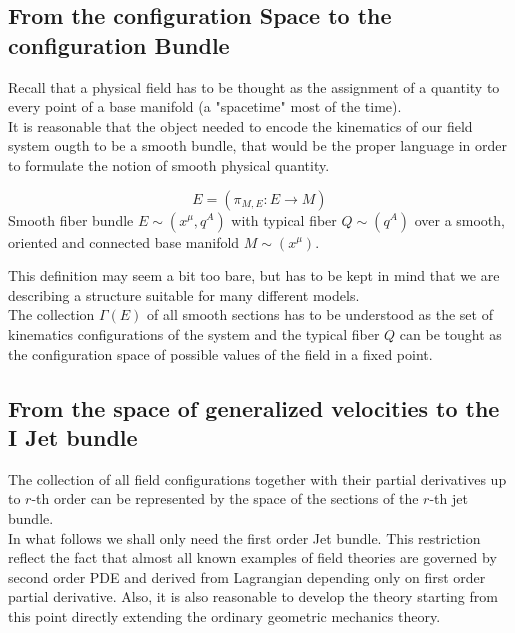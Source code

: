 \subsection{From the configuration Space to the configuration Bundle}
Recall that a physical field has to be thought as the assignment of a quantity to every point of a base manifold (a "spacetime" most of the time).
\\
It is reasonable that the object needed to encode the kinematics of our field system ougth to be a smooth bundle, that would be the proper language in order to formulate the notion of smooth physical quantity.
\\
\begin{definition} 
 	\begin{displaymath}
 		E = \left( \pi_{M,E} : E\rightarrow M \right)
 	\end{displaymath}
Smooth fiber bundle $E\sim(x^\mu,q^A)$ with typical fiber $Q\sim(q^A)$ over a smooth, oriented and connected base manifold $M\sim(x^\mu)$.
\end{definition}
This definition may seem a bit too bare, but has to be kept in mind that we are describing a structure suitable for many different models.
\\
The collection $\Gamma(E)$ of all smooth sections has to be understood as the set of kinematics configurations of the system and the typical fiber $Q$ can be tought as the configuration space of possible values of the field in a fixed point.

\subsection{From the space of generalized velocities to the I Jet bundle}
The collection of all field configurations together with their partial derivatives up to $r$-th order can be represented by the space of the sections of the $r$-th jet bundle.
\\
In what follows we shall only need the first order Jet bundle. This restriction reflect the fact that almost all known examples of field theories are governed by second order PDE and derived from Lagrangian depending only on first order partial derivative.
Also, it is also reasonable to develop the theory starting from this point directly extending the ordinary geometric mechanics theory.

